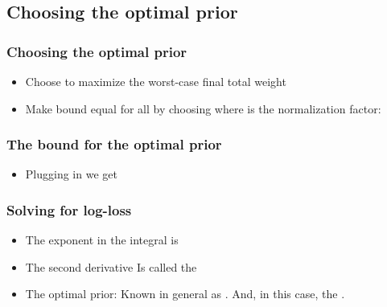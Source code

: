 \documentclass[handout]{beamer}
\begin{document}
\subsection{Choosing the optimal prior}

\begin{frame}
\frametitle{Choosing the optimal prior}
\begin{itemize}
\item
Choose \R{$\dweight{\theta}{}$} to maximize the worst-case final total weight
\R{\[
\min_{\btheta} \dweight{\btheta}{} \sqrt{-2 \pi \over 
T \left. {d^2 \over d\theta^2} \right|_{\theta=\btheta} 
(g(\btheta,\theta)-g(\btheta,\btheta))}
\]}
\item
Make bound equal for all \R{$\btheta \in [0,1]$} by choosing
\R{\[
\dweight{\btheta}{*} =
{1 \over Z}
\sqrt{\left. {d^2 \over d\theta^2} \right|_{\theta=\btheta} 
(g(\btheta,\theta)-g(\btheta,\btheta)) \over - 2 \pi}~,
\]}
where  is the normalization factor:
\R{\[
Z =\sqrt{1 \over 2 \pi}\;\;
\int_0^1 \;\;\sqrt{\left. {d^2 \over d\theta^2} \right|_{\theta=\btheta} 
(g(\btheta,\btheta)-g(\btheta,\theta))} \;\;d\btheta
\]}
\end{itemize}
\end{frame}


\begin{frame}
\frametitle{The bound for the optimal prior}
\begin{itemize}
\item Plugging in we get
\end{itemize}
\end{frame}

\begin{frame}
\frametitle{Solving for log-loss}
\begin{itemize}
\item
The exponent in the integral is
\R{\[
g(\btheta,\theta) - g(\btheta,\btheta)
=
\btheta \ln {\btheta \over \theta} + 
(1-\btheta) \ln {1-\btheta \over 1-\theta}
=
D_{KL} (\btheta || \theta)
\]}
\item
The second derivative
\R{\[
\left. {d^2 \over d\theta^2} \right|_{\theta=\btheta} 
D_{KL} (\btheta || \theta) = \btheta (1-\btheta)
\]}
Is called the 
\item
The optimal prior:
\R{\[
\dweight{\btheta}{*} = \frac{1}{\pi \sqrt{\btheta (1-\btheta)}}
\]}
Known in general as .  And, in this case, 
the .
\end{itemize}
\end{frame}
\end{document}
